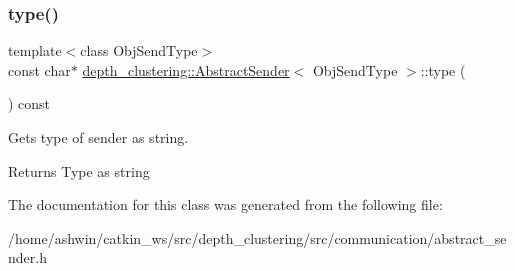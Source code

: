 \subsubsection{\texorpdfstring{type()}{type()}}
{\footnotesize\ttfamily template$<$class Obj\+Send\+Type$>$ \\
const char$\ast$ \hyperlink{classdepth__clustering_1_1AbstractSender}{depth\+\_\+clustering\+::\+Abstract\+Sender}$<$ Obj\+Send\+Type $>$\+::type (\begin{DoxyParamCaption}{ }\end{DoxyParamCaption}) const\hspace{0.3cm}{\ttfamily [inline]}}



Gets type of sender as string. 

\begin{DoxyReturn}{Returns}
Type as string 
\end{DoxyReturn}


The documentation for this class was generated from the following file\+:\begin{DoxyCompactItemize}
\item 
/home/ashwin/catkin\+\_\+ws/src/depth\+\_\+clustering/src/communication/abstract\+\_\+sender.\+h\end{DoxyCompactItemize}
